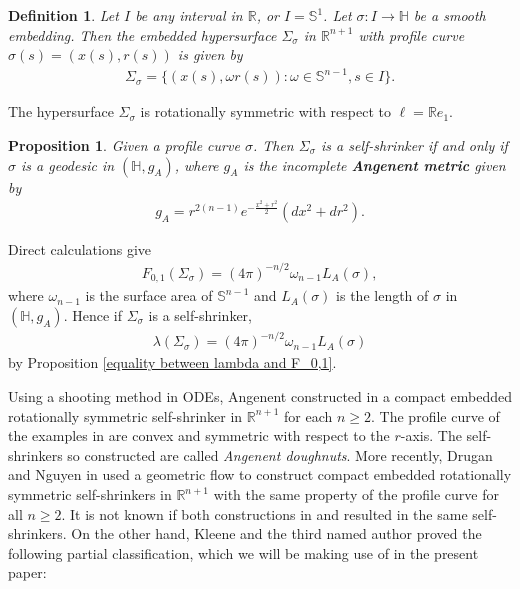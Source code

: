 \documentclass[12pt]{amsart}
\numberwithin{equation}{section}
\newtheorem{prop}[thm]{Proposition}
\newtheorem{dfn}[thm]{Definition}
\theoremstyle{remark}
\begin{document}
	\begin{dfn}
		Let $I$ be any interval in $\mathbb R$, or $I=\mathbb S^1$. Let $\sigma : I \to \mathbb H$ be a smooth embedding. Then the embedded hypersurface $\Sigma_\sigma$ in $\mathbb R^{n+1}$ with profile curve $\sigma(s) = (x(s), r(s))$ is given by 
		\begin{align*}
			\Sigma_\sigma = \{ (x(s), \omega r(s)) : \omega\in \mathbb S^{n-1}, s\in I\}.
		\end{align*}
	\end{dfn}
	
	The hypersurface $\Sigma_\sigma$ is rotationally symmetric with respect to $\ell = \mathbb{R} e_1$.
	
	\begin{prop}
		Given a profile curve $\sigma$. Then $\Sigma_\sigma$ is a self-shrinker if and only if $\sigma$ is a geodesic in $(\mathbb H, g_A)$, where $g_A$ is the incomplete {\bf Angenent metric} given by 
		\begin{align}\label{dfn of ang metric}
			g_A = r^{2(n-1)} e^{-\frac{x^2 + r^2}{2}} (dx^2 + dr^2).
		\end{align} 
	\end{prop}
	Direct calculations give
	\begin{align*}
		F_{0,1} (\Sigma_\sigma) = (4\pi)^{-n/2} \omega_{n-1} L_A(\sigma), 
	\end{align*}
	where $\omega_{n-1}$ is the surface area of $\mathbb S^{n-1}$ and $L_A(\sigma)$ is the length of $\sigma$ in $(\mathbb H, g_A)$. Hence if $\Sigma_\sigma$ is a self-shrinker, 
	\begin{align} \label{relation between entropy and length}
		\lambda (\Sigma_\sigma) = (4\pi)^{-n/2} \omega_{n-1} L_A(\sigma)
	\end{align}
	by Proposition \ref{equality between lambda and F_0,1}.
	
	
	Using a shooting method in ODEs, Angenent constructed in \cite{Ang} a compact embedded rotationally symmetric self-shrinker in $\mathbb R^{n+1}$ for each $n\ge 2$. The profile curve of the examples in \cite{Ang} are convex and symmetric with respect to the $r$-axis. The self-shrinkers so constructed are called {\sl Angenent doughnuts}. More recently, Drugan and Nguyen in \cite{DN} used a geometric flow to construct compact embedded rotationally symmetric self-shrinkers in $\mathbb R^{n+1}$ with the same property of the profile curve for all $n\ge 2$. It is not known if both constructions in \cite{Ang} and \cite{DN} resulted in the same self-shrinkers. On the other hand, Kleene and the third named author proved the following partial classification, which we will be making use of in the present paper:
	
\end{document}
